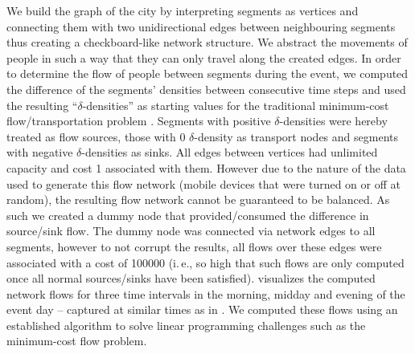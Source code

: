 \documentclass[12pt,a4paper,twoside,openright]{book}
\begin{document}
We build the graph of the city by interpreting segments as vertices and connecting them with two unidirectional edges between neighbouring segments thus creating a checkboard-like network structure.
%
We abstract the movements of people in such a way that they can only travel along the created edges.
%
In order to determine the flow of people between segments during the event, we computed the difference of the segments' densities between consecutive time steps and used the resulting ``$\delta$-densities'' as starting values for the traditional minimum-cost flow/transportation problem \cite{Monge1781}.
%
Segments with positive $\delta$-densities were hereby treated as flow sources, those with 0 $\delta$-density as transport nodes and segments with negative $\delta$-densities as sinks.
%
All edges between vertices had unlimited capacity and cost 1 associated with them.
%
However due to the nature of the data used to generate this flow network (mobile devices that were turned on or off at random), the resulting flow network cannot be guaranteed to be balanced.
%
As such we created a dummy node that provided/consumed the difference in source/sink flow.
%
The dummy node was connected via network edges to all segments, however to not corrupt the results, all flows over these edges were associated with a cost of 100000 (i.\,e., so high that such flows are only computed once all normal sources/sinks have been satisfied).
%
 visualizes the computed network flows for three time intervals in the morning, midday and evening of the event day -- captured at similar times as in .
%
We computed these flows using an established algorithm \cite{berkelaar2004} to solve linear programming challenges such as the minimum-cost flow problem.
\end{document}
